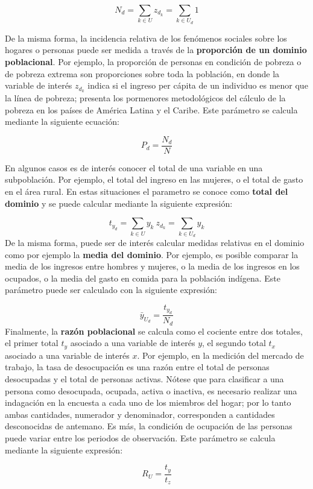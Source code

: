\documentclass[
  10pt,
  spanish,
]{book}
\begin{document}
\[N_d = \sum_{k \in U}z_{d_k} = \sum_{k \in U_d}1\]

De la misma forma, la incidencia relativa de los fenómenos sociales sobre los hogares o personas puede ser medida a través de la \textbf{proporción de un dominio poblacional}. Por ejemplo, la proporción de personas en condición de pobreza o de pobreza extrema son proporciones sobre toda la población, en donde la variable de interés \(z_{d_k}\) indica si el ingreso per cápita de un individuo es menor que la línea de pobreza; \citet{CEPAL_2018} presenta los pormenores metodológicos del cálculo de la pobreza en los países de América Latina y el Caribe. Este parámetro se calcula mediante la siguiente ecuación:

\[P_d=\frac{N_d}{N}\]

En algunos casos es de interés conocer el total de una variable en una subpoblación. Por ejemplo, el total del ingreso en las mujeres, o el total de gasto en el área rural. En estas situaciones el parametro se conoce como \textbf{total del dominio} y se puede calcular mediante la siguiente expresión:

\[t_{y_d} = \sum_{k \in U}y_{k} \ z_{d_k} = \sum_{k \in U_d}y_{k}\]
De la misma forma, puede ser de interés calcular medidas relativas en el dominio como por ejemplo la \textbf{media del dominio}. Por ejemplo, es posible comparar la media de los ingresos entre hombres y mujeres, o la media de los ingresos en los ocupados, o la media del gasto en comida para la población indígena. Este parámetro puede ser calculado con la siguiente expresión:

\[\bar y_{U_d} = \frac{t_{y_d}}{N_d}\]
Finalmente, la \textbf{razón poblacional} se calcula como el cociente entre dos totales, el primer total \(t_y\) asociado a una variable de interés \(y\), el segundo total \(t_x\) asociado a una variable de interés \(x\). Por ejemplo, en la medición del mercado de trabajo, la tasa de desocupación es una razón entre el total de personas desocupadas y el total de personas activas. Nótese que para clasificar a una persona como desocupada, ocupada, activa o inactiva, es necesario realizar una indagación en la encuesta a cada uno de los miembros del hogar; por lo tanto ambas cantidades, numerador y denominador, corresponden a cantidades desconocidas de antemano. Es más, la condición de ocupación de las personas puede variar entre los periodos de observación. Este parámetro se calcula mediante la siguiente expresión:

\[R_U=\frac{t_y}{t_z}\]
\end{document}
